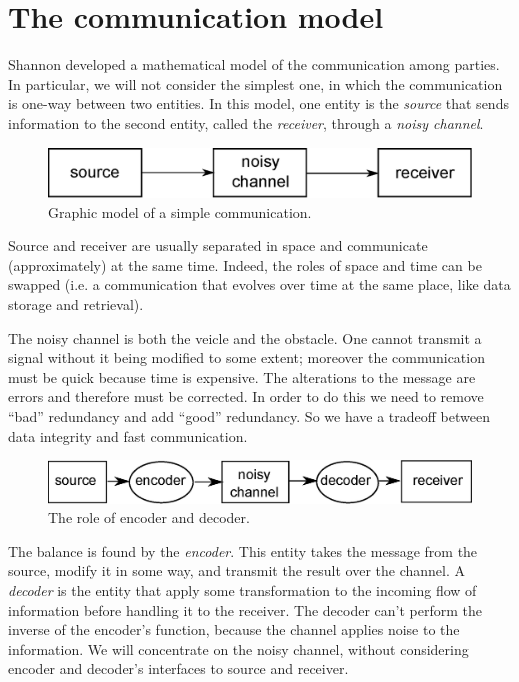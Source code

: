 \chapter{The communication model}

Shannon developed a mathematical model of the communication among parties. In particular, we will not consider the simplest one, in which the communication is one-way between two entities. In this model, one entity is the \emph{source} that sends information to the second entity, called the \emph{receiver}, through a \emph{noisy channel}.

\begin{figure}[h!]
	\centering
	\includegraphics[width=0.6\linewidth]{pictures/comm-channel.eps}
	\caption{Graphic model of a simple communication.}
\end{figure}

Source and receiver are usually separated in space and communicate (approximately) at the same time. Indeed, the roles of space and time can be swapped (i.e. a communication that evolves over time at the same place, like data storage and retrieval).

The noisy channel is both the veicle and the obstacle. One cannot transmit a signal without it being modified to some extent; moreover the communication must be quick because time is expensive. The alterations to the message are errors and therefore must be corrected. In order to do this we need to remove ``bad'' redundancy and add ``good'' redundancy. So we have a tradeoff between data integrity and fast communication.

\begin{figure}[h!]
	\centering
	\includegraphics[width=0.9\linewidth]{pictures/comm-channel1.eps}
	\caption{The role of encoder and decoder.}
\end{figure}

The balance is found by the \emph{encoder}. This entity takes the message from the source, modify it in some way, and transmit the result over the channel. A \emph{decoder} is the entity that apply some transformation to the incoming flow of information before handling it to the receiver. The decoder can't perform the inverse of the encoder's function, because the channel applies noise to the information. We will concentrate on the noisy channel, without considering encoder and decoder's interfaces to source and receiver.

